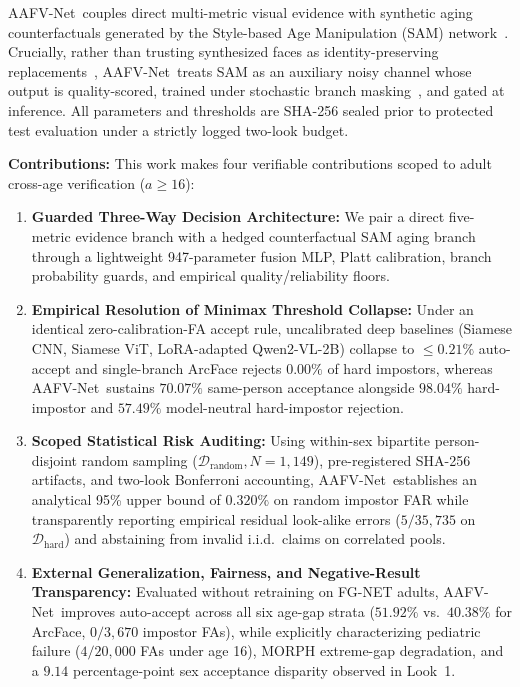 \documentclass[journal]{IEEEtran}
\newcommand{\sys}{AAFV-Net}
\begin{document}
\sys\ couples direct multi-metric visual evidence with synthetic aging counterfactuals generated by the Style-based Age Manipulation (SAM) network~\cite{alaluf2021sam}. Crucially, rather than trusting synthesized faces as identity-preserving replacements~\cite{zhou2024openset}, \sys\ treats SAM as an auxiliary noisy channel whose output is quality-scored, trained under stochastic branch masking~\cite{poh2009quality}, and gated at inference. All parameters and thresholds are SHA-256 sealed prior to protected test evaluation under a strictly logged two-look budget.

\textbf{Contributions:} This work makes four verifiable contributions scoped to adult cross-age verification ($a \ge 16$):
\begin{enumerate}
    \item \textbf{Guarded Three-Way Decision Architecture:} We pair a direct five-metric evidence branch with a hedged counterfactual SAM aging branch through a lightweight 947-parameter fusion MLP, Platt calibration, branch probability guards, and empirical quality/reliability floors.
    \item \textbf{Empirical Resolution of Minimax Threshold Collapse:} Under an identical zero-calibration-FA accept rule, uncalibrated deep baselines (Siamese CNN, Siamese ViT, LoRA-adapted Qwen2-VL-2B) collapse to $\le 0.21\%$ auto-accept and single-branch ArcFace rejects $0.00\%$ of hard impostors, whereas \sys\ sustains $70.07\%$ same-person acceptance alongside $98.04\%$ hard-impostor and $57.49\%$ model-neutral hard-impostor rejection.
    \item \textbf{Scoped Statistical Risk Auditing:} Using within-sex bipartite person-disjoint random sampling ($\mathcal{D}_{\text{random}}, N=1{,}149$), pre-registered SHA-256 artifacts, and two-look Bonferroni accounting, \sys\ establishes an analytical 95\% upper bound of $0.320\%$ on random impostor FAR while transparently reporting empirical residual look-alike errors ($5/35{,}735$ on $\mathcal{D}_{\text{hard}}$) and abstaining from invalid i.i.d.\ claims on correlated pools.
    \item \textbf{External Generalization, Fairness, and Negative-Result Transparency:} Evaluated without retraining on FG-NET adults, \sys\ improves auto-accept across all six age-gap strata ($51.92\%$ vs.\ $40.38\%$ for ArcFace, $0/3{,}670$ impostor FAs), while explicitly characterizing pediatric failure ($4/20{,}000$ FAs under age 16), MORPH extreme-gap degradation, and a $9.14$ percentage-point sex acceptance disparity observed in Look~1.
\end{enumerate}
\end{document}

